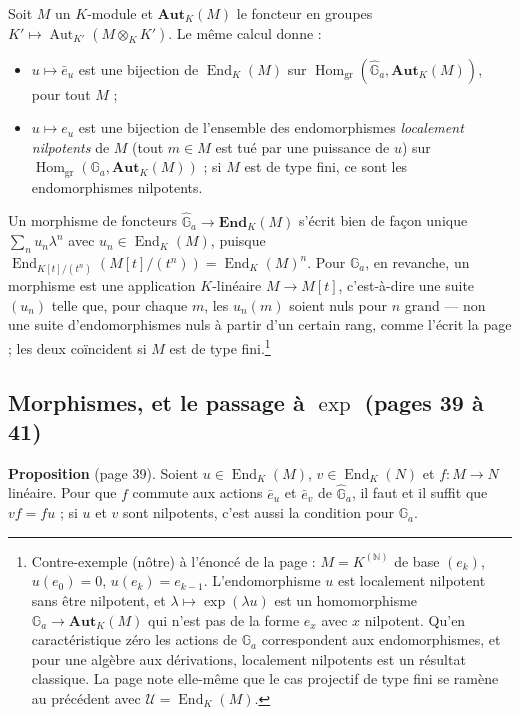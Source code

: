 \documentclass[11pt,a4paper]{article}
\begin{document}
Soit $M$ un $K$-module et $\mathbf{Aut}_K(M)$ le foncteur en groupes
$K' \mapsto \operatorname{Aut}_{K'}(M \otimes_K K')$. Le même calcul
donne :
\begin{itemize}
  \item[$(*)$] $u \mapsto \bar e_u$ est une bijection de
  $\operatorname{End}_K(M)$ sur
  $\operatorname{Hom}_{\mathrm{gr}}(\widehat{\mathbb{G}}_a, \mathbf{Aut}_K(M))$,
  pour tout $M$ ;
  \item[$(**)$] $u \mapsto e_u$ est une bijection de l'ensemble des
  endomorphismes \emph{localement nilpotents} de $M$ (tout $m \in M$ est tué
  par une puissance de $u$) sur
  $\operatorname{Hom}_{\mathrm{gr}}(\mathbb{G}_a, \mathbf{Aut}_K(M))$ ; si $M$
  est de type fini, ce sont les endomorphismes nilpotents.
\end{itemize}
Un morphisme de foncteurs $\widehat{\mathbb{G}}_a \to \mathbf{End}_K(M)$
s'écrit bien de façon unique $\sum_n u_n \lambda^n$ avec
$u_n \in \operatorname{End}_K(M)$, puisque
$\operatorname{End}_{K[t]/(t^n)}(M[t]/(t^n)) = \operatorname{End}_K(M)^n$.
Pour $\mathbb{G}_a$, en revanche, un morphisme est une application
$K$-linéaire $M \to M[t]$, c'est-à-dire une suite $(u_n)$ telle que, pour
chaque $m$, les $u_n(m)$ soient nuls pour $n$ grand --- non une suite
d'endomorphismes nuls à partir d'un certain rang, comme l'écrit la page ; les
deux coïncident si $M$ est de type fini.\footnote{Contre-exemple (nôtre) à
l'énoncé de la page : $M = K^{(\mathbb{N})}$ de base $(e_k)$, $u(e_0) = 0$,
$u(e_k) = e_{k-1}$. L'endomorphisme $u$ est localement nilpotent sans être
nilpotent, et $\lambda \mapsto \exp(\lambda u)$ est un homomorphisme
$\mathbb{G}_a \to \mathbf{Aut}_K(M)$ qui n'est pas de la forme $e_x$ avec
$x$ nilpotent. Qu'en caractéristique zéro les actions de $\mathbb{G}_a$
correspondent aux endomorphismes, et pour une algèbre aux dérivations,
localement nilpotents est un résultat classique. La page note elle-même que
le cas projectif de type fini se ramène au précédent avec
$\mathcal{U} = \operatorname{End}_K(M)$.}

\subsection*{Morphismes, et le passage à $\exp$ (pages 39 à 41)}

\textbf{Proposition} (page 39). Soient $u \in \operatorname{End}_K(M)$,
$v \in \operatorname{End}_K(N)$ et $f : M \to N$ linéaire. Pour que $f$
commute aux actions $\bar e_u$ et $\bar e_v$ de $\widehat{\mathbb{G}}_a$, il
faut et il suffit que $vf = fu$ ; si $u$ et $v$ sont nilpotents, c'est aussi
la condition pour $\mathbb{G}_a$.
\end{document}
